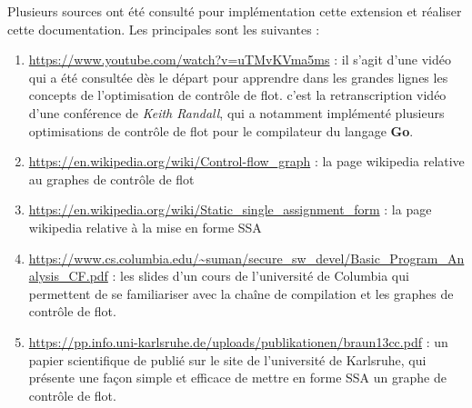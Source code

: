 \documentclass[
]{article}
\begin{document}
Plusieurs sources ont été consulté pour implémentation cette extension
et réaliser cette documentation. Les principales sont les suivantes :

\begin{enumerate}
\def\labelenumi{\arabic{enumi}.}
\item
  \url{https://www.youtube.com/watch?v=uTMvKVma5ms} : il s'agit d'une
  vidéo qui a été consultée dès le départ pour apprendre dans les
  grandes lignes les concepts de l'optimisation de contrôle de flot.
  c'est la retranscription vidéo d'une conférence de \emph{Keith
  Randall}, qui a notamment implémenté plusieurs optimisations de
  contrôle de flot pour le compilateur du langage \textbf{Go}.
\item
  \url{https://en.wikipedia.org/wiki/Control-flow_graph} : la page
  wikipedia relative au graphes de contrôle de flot
\item
  \url{https://en.wikipedia.org/wiki/Static_single_assignment_form} : la
  page wikipedia relative à la mise en forme SSA
\item
  \url{https://www.cs.columbia.edu/~suman/secure_sw_devel/Basic_Program_Analysis_CF.pdf}
  : les slides d'un cours de l'université de Columbia qui permettent de
  se familiariser avec la chaîne de compilation et les graphes de
  contrôle de flot.
\item
  \url{https://pp.info.uni-karlsruhe.de/uploads/publikationen/braun13cc.pdf}
  : un papier scientifique de publié sur le site de l'université de
  Karlsruhe, qui présente une façon simple et efficace de mettre en
  forme SSA un graphe de contrôle de flot.
\end{enumerate}
\end{document}
